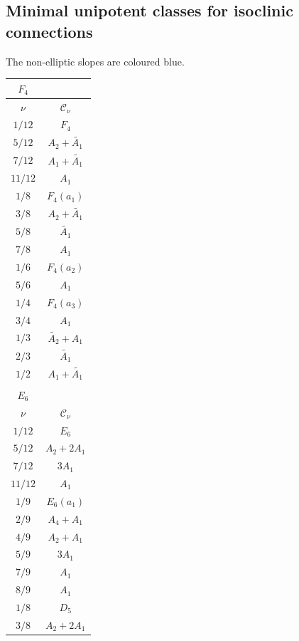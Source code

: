 \documentclass[11pt]{amsart}
\theoremstyle{definition}
\newcommand{\cC}{\mathcal{C}}
\begin{document}
\subsection{Minimal unipotent classes for isoclinic connections} The non-elliptic slopes are coloured blue.
\label{ss:minimal}
\begin{table}[H]
\begin{tabular}{|c|c|}
\multicolumn{1}{c}{$F_4$} & \multicolumn{1}{c}{} \\ 
\hline
$\nu$ & $\cC_\nu$ \\
\hline
$1/12$  & $F_4$                 \\
$5/12$  & $A_2+\widetilde{A_1}$ \\
$7/12$  & $A_1+\widetilde{A_1}$ \\
$11/12$ & $A_1$                 \\
$1/8$ & $F_4(a_1)$            \\
$3/8$ & $A_2+\widetilde{A_1}$ \\
$5/8$ & $\widetilde{A_1}$     \\
$7/8$ & $A_1$                 \\
$1/6$ & $F_4(a_2)$ \\
$5/6$ & $A_1$      \\
$1/4$ & $F_4(a_3)$ \\
$3/4$ & $A_1$      \\
$1/3$ & $\widetilde{A_2}+A_1$ \\
$2/3$ & $\widetilde{A_1}$     \\
$1/2$ & $A_1+\widetilde{A_1}$ \\
\hline
\multicolumn{1}{c}{} & \multicolumn{1}{c}{} \\ 
\multicolumn{1}{c}{$E_6$} & \multicolumn{1}{c}{} \\ 
\hline
$\nu$ & $\cC_\nu$ \\
\hline
$1/12$  & $E_6$     \\
$5/12$  & $A_2+2A_1$ \\
$7/12$  & $3A_1$     \\
$11/12$ & $A_1$      \\
$1/9$ & $E_6(a_1)$ \\
$2/9$ & $A_4+A_1$  \\
$4/9$ & $A_2+A_1$  \\
$5/9$ & $3A_1$     \\
$7/9$ & $A_1$      \\
$8/9$ & $A_1$      \\
\color{blue}$1/8$ & $D_5$  \\
\color{blue}$3/8$ & $A_2+2A_1$ \\

\end{tabular}
\end{table}
\end{document}
